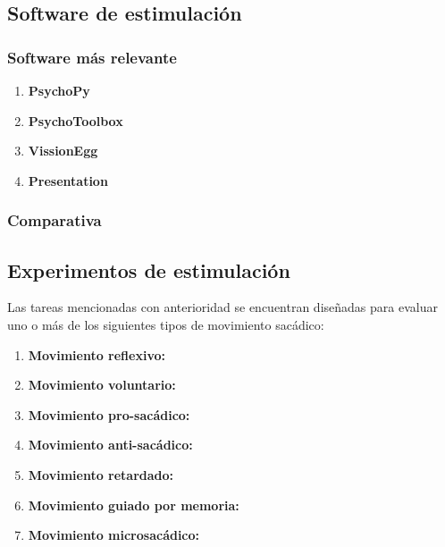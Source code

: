 \documentclass[../main.tex]{subfiles}
\begin{document}
		\subsection{Software de estimulación}
		\label{sub:02_software_de_estimulacion}
			\subsubsection{Software más relevante}
			\label{ssub:02_software_mas_relevante}
				\begin{enumerate}
					\item \textbf{PsychoPy}

					\item \textbf{PsychoToolbox}

					\item \textbf{VissionEgg}

					\item \textbf{Presentation}

				\end{enumerate}

			\subsubsection{Comparativa}
			\label{ssub:02_comparativa_software}

		\subsection{Experimentos de estimulación}
		\label{sub:02_experimentos_de_estimulacion}

		Las tareas mencionadas con anterioridad \cite{article:tests_1, article:tests_2} se encuentran diseñadas para evaluar uno o más de los siguientes tipos de movimiento sacádico:
		\begin{enumerate}
		 	\item \textbf{Movimiento reflexivo:}

		 	\item \textbf{Movimiento voluntario:}
		 	
		 	\item \textbf{Movimiento pro-sacádico:}
		 	
		 	\item \textbf{Movimiento anti-sacádico:}

		 	\item \textbf{Movimiento retardado:}

		 	\item \textbf{Movimiento guiado por memoria:}

		 	\item \textbf{Movimiento microsacádico:}

		 \end{enumerate} 
\end{document}
